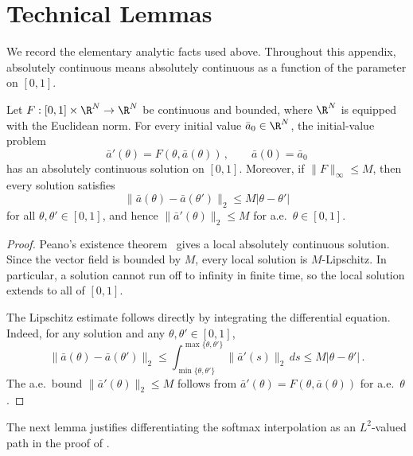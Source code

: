 \documentclass[11pt]{article}
\begin{document}



\appendix

\section{Technical Lemmas}

We record the elementary analytic facts used above.
Throughout this appendix, absolutely continuous means absolutely continuous as a function of the parameter on $[0,1]$.

\begin{lemma}
\label{lem:bounded-ode}
	Let $F:[0,1]\times\R^N\to\R^N$ be continuous and bounded, where $\R^N$ is equipped with the Euclidean norm.
	For every initial value $\bar{a}_0\in\R^N$, the initial-value problem
	\[
		\bar{a}'(\theta)
		=
		F(\theta,\bar{a}(\theta))\,,
		\qquad
		\bar{a}(0)=\bar{a}_0
	\]
	has an absolutely continuous solution on $[0,1]$.
	Moreover, if $\|F\|_\infty\leq  M$, then every solution satisfies
	\[
		\|\bar{a}(\theta)-\bar{a}(\theta')\|_2
		\leq 
		M|\theta-\theta'|
	\]
	for all $\theta,\theta'\in[0,1]$, and hence $\|\bar{a}'(\theta)\|_2\leq  M$ for a.e.~$\theta\in[0,1]$.
\end{lemma}

\begin{proof}
	Peano's existence theorem~\cite[Theorem 2.19]{Tes12} gives a local absolutely continuous solution.
	Since the vector field is bounded by $M$, every local solution is $M$-Lipschitz.
	In particular, a solution cannot run off to infinity in finite time, so the local solution extends to all of $[0,1]$.

	The Lipschitz estimate follows directly by integrating the differential equation.
	Indeed, for any solution and any $\theta,\theta'\in[0,1]$,
	\[
		\|\bar{a}(\theta)-\bar{a}(\theta')\|_2
		\leq 
		\int_{\min\{\theta,\theta'\}}^{\max\{\theta,\theta'\}}
		\|\bar{a}'(s)\|_2\,ds
		\leq 
		M|\theta-\theta'|\,.
	\]
	The a.e.~bound $\|\bar{a}'(\theta)\|_2\leq  M$ follows from $\bar{a}'(\theta)=F(\theta,\bar{a}(\theta))$ for a.e.~$\theta$.
\end{proof}

The next lemma justifies differentiating the softmax interpolation as an $L^2$-valued path in the proof of . 
\end{document}
